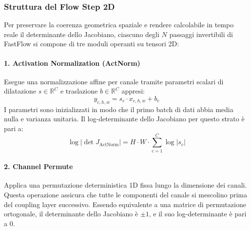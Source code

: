 \subsubsection{Struttura del Flow Step 2D}
Per preservare la coerenza geometrica spaziale e rendere calcolabile in tempo reale il determinante dello Jacobiano, ciascuno degli $N$ passaggi invertibili di FastFlow si compone di tre moduli operanti su tensori 2D:

\paragraph{1. Activation Normalization (ActNorm)}
Esegue una normalizzazione affine per canale tramite parametri scalari di dilatazione $s \in \mathbb{R}^C$ e traslazione $b \in \mathbb{R}^C$ appresi:
\begin{equation}
    y_{c, h, w} = s_c \cdot x_{c, h, w} + b_c
\end{equation}
I parametri sono inizializzati in modo che il primo batch di dati abbia media nulla e varianza unitaria. Il log-determinante dello Jacobiano per questo strato è pari a:
\begin{equation}
    \log \left| \det J_{\text{ActNorm}} \right| = H \cdot W \cdot \sum_{c=1}^C \log |s_c|
\end{equation}

\paragraph{2. Channel Permute}
Applica una permutazione deterministica 1D fissa lungo la dimensione dei canali. Questa operazione assicura che tutte le componenti del canale si mescolino prima del coupling layer successivo. Essendo equivalente a una matrice di permutazione ortogonale, il determinante dello Jacobiano è $\pm 1$, e il suo log-determinante è pari a $0$.

